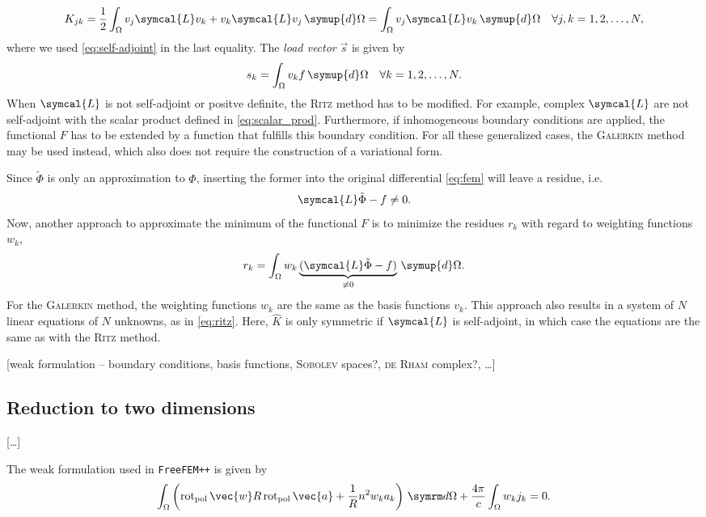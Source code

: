 \begin{gather}
  K_{jk} = \frac{1}{2} \int_{\Omega} v_{j} \symcal{L} v_{k} + v_{k} \symcal{L} v_{j} \, \symup{d} \Omega = \int_{\Omega} v_{j} \symcal{L} v_{k} \, \symup{d} \Omega \quad \forall j, k = 1, 2, \dotsc, N,
\end{gather}
where we used \cref{eq:self-adjoint} in the last equality. The \emph{load vector} $\vec{s}$ is given by
\begin{gather}
  s_{k} = \int_{\Omega} v_{k} f \, \symup{d} \Omega \quad \forall k = 1, 2, \dotsc, N.
\end{gather}
When $\symcal{L}$ is not self-adjoint or positve definite, the \textsc{Ritz} method has to be modified. For example, complex $\symcal{L}$ are not self-adjoint with the scalar product defined in \cref{eq:scalar_prod}. Furthermore, if inhomogeneous boundary conditions are applied, the functional $F$ has to be extended by a function that fulfills this boundary condition. For all these generalized cases, the \textsc{Galerkin} method may be used instead, which also does not require the construction of a variational form.

Since $\tilde{\Phi}$ is only an approximation to $\Phi$, inserting the former into the original differential \cref{eq:fem} will leave a residue, i.e.
\begin{gather}
  \symcal{L} \tilde{\Phi} - f \neq 0.
\end{gather}
Now, another approach to approximate the minimum of the functional $F$ is to minimize the residues $r_{k}$ with regard to weighting functions $w_{k}$,
\begin{gather}
  r_{k} = \int_{\Omega} w_{k} \underbrace{(\symcal{L} \tilde{\Phi} - f)}_{\neq 0} \, \symup{d} \Omega.
\end{gather}
For the \textsc{Galerkin} method, the weighting functions $w_{k}$ are the same as the basis functions $v_{k}$. This approach also results in a system of $N$ linear equations of $N$ unknowns, as in \cref{eq:ritz}. Here, $\hat{K}$ is only symmetric if $\symcal{L}$ is self-adjoint, in which case the equations are the same as with the \textsc{Ritz} method.

[weak formulation -- boundary conditions, basis functions, \textsc{Sobolev} spaces?, \textsc{de Rham} complex?, \ldots]

\subsection{Reduction to two dimensions}
\label{sec:fourier-fem}

[\ldots]

The weak formulation used in \texttt{FreeFEM++} is given by  %
\begin{gather}
  \int_{\Omega} \left ( \polCurl \vec{w} R \polCurl \vec{a} + \frac{1}{R} n^{2} w_{k} a_{k} \right ) \, \diff \Omega + \frac{4 \pi}{c} \int_{\Omega} w_{k} j_{k} = 0.
\end{gather}

